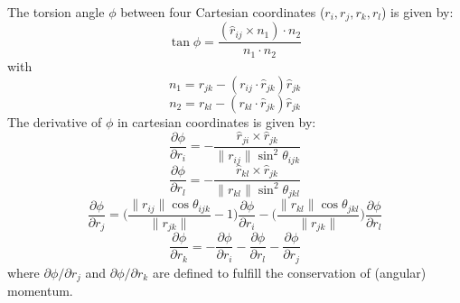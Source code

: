 The torsion angle $\phi$ between four Cartesian coordinates ($r_i, r_j, r_k, r_l$) is given by:
\begin{equation}
  \tan \phi = \frac{(\hat{r}_{ij} \times n_1) \cdot n_2}{n_1 \cdot n_2}
\end{equation}
with
\begin{equation}
  n_1 = r_{jk} - (r_{ij} \cdot \hat{r}_{jk})\hat{r}_{jk}
\end{equation}
\begin{equation}
  n_2 = r_{kl} - (r_{kl} \cdot \hat{r}_{jk})\hat{r}_{jk}
\end{equation}
The derivative of $\phi$ in cartesian coordinates is given by:
\begin{equation}
  \frac{\partial\phi}{\partial r_i} = - \frac{\hat{r}_{ji}\times\hat{r}_{jk}}{\|r_{ij}\|\sin^2\theta_{ijk}}
\end{equation}
\begin{equation}
  \frac{\partial\phi}{\partial r_l} = - \frac{\hat{r}_{kl}\times\hat{r}_{jk}}{\|r_{kl}\|\sin^2\theta_{jkl}}
\end{equation}
\begin{equation}
  \frac{\partial\phi}{\partial r_j} = \bigl(\frac{\|r_{ij} \| \cos\theta_{ijk}}{\|r_{jk} \|}-1\bigr) \frac{\partial\phi}{\partial r_i} - \bigl( \frac{\|r_{kl} \| \cos\theta_{jkl}}{\|r_{jk} \|}\bigr)\frac{\partial\phi}{\partial r_l}
\end{equation}
\begin{equation}
  \frac{\partial\phi}{\partial r_k} = - \frac{\partial\phi}{\partial r_i} - \frac{\partial\phi}{\partial r_l} - \frac{\partial\phi}{\partial r_j}
\end{equation}
where $\partial \phi/\partial r_j$ and $\partial \phi/\partial r_k$ are defined to fulfill the conservation of (angular) momentum.

